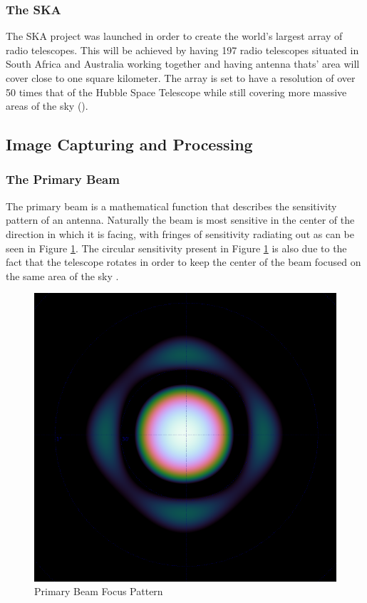 \subsubsection{The SKA}
The SKA project was launched in order to create the world's largest array of radio telescopes. This will be achieved by having 197 radio telescopes situated in South Africa and Australia working together and having antenna thats' area will cover close to one square kilometer. The array is set to have a resolution of over 50 times that of the Hubble Space Telescope while still covering more massive areas of the sky (\cite{SKAsite}).
\subsection{Image Capturing and Processing}\label{ra:sec:ic}
%
\subsubsection{The Primary Beam}\label{ra:ssec:tpb}
The primary beam is a mathematical function that describes the sensitivity pattern of an antenna. Naturally the beam is most sensitive in the center of the direction in which it is facing, with fringes of sensitivity radiating out as can be seen in Figure \ref{ra:fig:beam}. The circular sensitivity present in Figure \ref{ra:fig:beam} is also due to the fact that the telescope rotates in order to keep the center of the beam focused on the same area of the sky \citep{oleg}.
%
\begin{figure}[H]
	\centering
	\includegraphics[scale=0.28]{Images/beam.png}
	\caption{Primary Beam Focus Pattern \citep{oleg}}
	\label{ra:fig:beam}
\end{figure}
%
